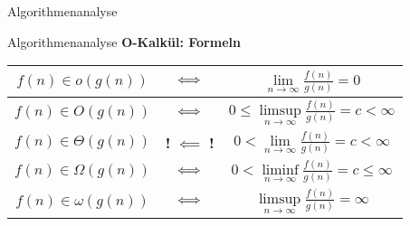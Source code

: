 \begin{frame}[t]{Algorithmenanalyse}
	
	
	
	
	
	
	
\end{frame}


\begin{frame}{Algorithmenanalyse}
	\textbf{O-Kalkül: Formeln} \\[0,125cm]
	{
		\renewcommand{\arraystretch}{1.7}%
		\begin{center}
			\begin{tabular}{ | c | c | >{\quad}c<{\quad} | }
				\hline
				$f(n) \in o      (g(n))$ & $\Gdw$ & \(\lim\limits_{n \to \infty} \frac{f(n)}{g(n)} = 0\) 
				\\  \hline
				$f(n) \in O      (g(n))$ & $\Gdw$ & \(0 \leq \limsup\limits_{n \to \infty} \frac{f(n)}{g(n)} = c < \infty\)
				\\ \hline
				$f(n) \in \Theta (g(n))$ & \cellcolor{adaptingred} {\textbf{!} $\bm{\impliedby}$ \textbf{!}} & \(0 < \lim\limits_{n \to \infty} \frac{f(n)}{g(n)} = c < \infty\)
				\\ \hline
				$f(n) \in \Omega (g(n))$ & $\Gdw$ & \(0 < \liminf\limits_{n \to \infty} \frac{f(n)}{g(n)} = c \leq \infty\)
				\\ \hline
				$f(n) \in \omega (g(n))$ & $\Gdw$ & \(\limsup\limits_{n \to \infty} \frac{f(n)}{g(n)} = \infty\)
				\\ \hline
			\end{tabular}
		\end{center}
	}
\end{frame}

